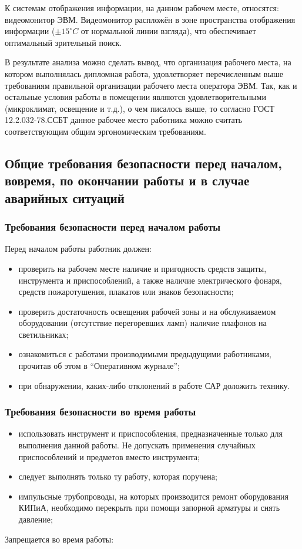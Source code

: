 К системам отображения информации, на данном рабочем месте, относятся: видеомонитор ЭВМ. Видеомонитор распложён в зоне пространства отображения информации ($\pm15^{\circ}C$ от нормальной линии взгляда), что обеспечивает оптимальный зрительный поиск.

В результате анализа можно сделать вывод, что организация рабочего места, на котором выполнялась дипломная работа, удовлетворяет перечисленным выше требованиям правильной организации рабочего места оператора ЭВМ. Так, как и остальные условия работы в помещении являются удовлетворительными (микроклимат, освещение и т.д.), о чем писалось выше, то согласно ГОСТ 12.2.032-78.ССБТ\cite{gost_sec_ergonom_32} данное рабочее место работника можно считать соответствующим общим эргономическим требованиям.

\subsection{Общие требования безопасности перед началом, вовремя, по окончании работы и в случае аварийных ситуаций}
\subsubsection{Требования безопасности перед началом работы}

Перед началом работы работник должен:

\begin{itemize}
\item проверить на рабочем месте наличие и пригодность средств защиты, инструмента и приспособлений, а также наличие электрического фонаря, средств пожаротушения, плакатов или знаков безопасности;
\item проверить достаточность освещения рабочей зоны и на обслуживаемом оборудовании (отсутствие перегоревших ламп) наличие плафонов на светильниках;
\item ознакомиться с работами производимыми предыдущими работниками, прочитав об этом в ``Оперативном журнале'';
\item при обнаружении, каких-либо отклонений в работе САР доложить технику.
\end{itemize}
\subsubsection{Требования безопасности во время работы}
\begin{itemize}
\item использовать инструмент и приспособления, предназначенные только для выполнения данной работы. Не допускать применения случайных приспособлений и предметов вместо инструмента;
\item следует выполнять только ту работу, которая поручена;
\item импульсные трубопроводы, на которых производится ремонт оборудования КИПиА, необходимо перекрыть при помощи запорной арматуры и снять давление;
\end{itemize}
Запрещается во время работы:

